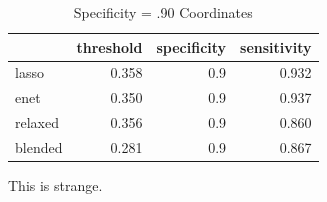 \documentclass[
]{book}
\begin{document}
\begin{table}

\caption{\label{tab:hcc5hmC-glmnetFit-thresh90}Specificity = .90 Coordinates}
\centering
\begin{tabular}[t]{l|r|r|r}
\hline
  & threshold & specificity & sensitivity\\
\hline
lasso & 0.358 & 0.9 & 0.932\\
\hline
enet & 0.350 & 0.9 & 0.937\\
\hline
relaxed & 0.356 & 0.9 & 0.860\\
\hline
blended & 0.281 & 0.9 & 0.867\\
\hline
\end{tabular}
\end{table}

This is strange.
\end{document}
